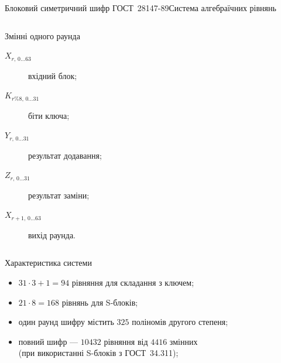 \documentclass[10pt, ucs]{beamer}
\begin{document}
\begin{frame}[shrink]{Блоковий симетричний шифр ГОСТ~28147-89}{Система алгебраїчних рівнянь}
    \begin{columns}
        \begin{column}{0.52\textwidth}
            \begin{block}{Змінні одного раунда}
                \begin{description}
                    \item[$X_{r, \, 0 \hdots 63}$]  вхідний блок;
                    \item[$K_{r \% 8, \, 0 \hdots 31}$]  біти ключа;
                    \item[$Y_{r, \, 0 \hdots 31}$]  результат додавання;
                    \item[$Z_{r, \, 0 \hdots 31}$]  результат заміни;
                    \item[$X_{r+1, \, 0 \hdots 63}$]  вихід раунда.
                \end{description}
            \end{block}
        \end{column}
        \begin{column}{0.5\textwidth}
            \begin{figure}[htbp]
                \centering
                
            \end{figure}
        \end{column}
    \end{columns}
    \begin{block}{Характеристика системи}
        \begin{itemize}
            \item $31 \cdot 3 + 1 = 94$ рівняння для складання з ключем;
            \item $21 \cdot 8 = 168$ рівнянь для S-блоків;
            \item один раунд шифру містить $325$ поліномів другого степеня;
            \item повний шифр --- $10432$ рівняння від $4416$ змінних \\
                (при використанні S-блоків з ГОСТ~34.311);
        \end{itemize}
    \end{block}
\end{frame}
\end{document}
